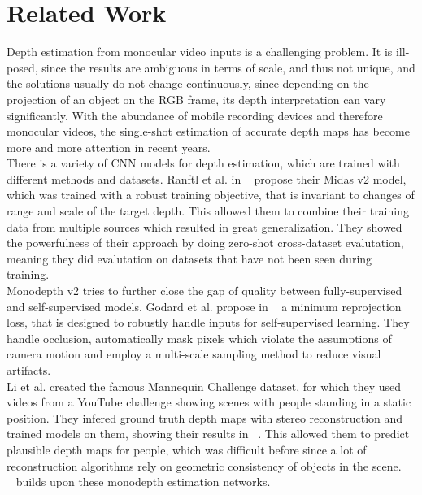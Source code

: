 \chapter{Related Work}
    Depth estimation from monocular video inputs is a challenging problem.
    It is ill-posed, since the results are ambiguous in terms of scale, and thus not unique, and the solutions usually do not change continuously, since depending on the projection of an object on the RGB frame, its depth interpretation can vary significantly.
    With the abundance of mobile recording devices and therefore monocular videos, the single-shot estimation of accurate depth maps has become more and more attention in recent years.\\
    There is a variety of CNN models for depth estimation, which are trained with different methods and datasets.
    Ranftl et al. in ~\cite{ranftl2020robust} propose their Midas v2 model, which was trained with a robust training objective, that is invariant to changes of range and scale of the target depth.
    This allowed them to combine their training data from multiple sources which resulted in great generalization.
    They showed the powerfulness of their approach by doing zero-shot cross-dataset evalutation, meaning they did evalutation on datasets that have not been seen during training.\\
    Monodepth v2 tries to further close the gap of quality between fully-supervised and self-supervised models.
    Godard et al. propose in ~\cite{godard2019digging} a minimum reprojection loss, that is designed to robustly handle inputs for self-supervised learning.
    They handle occlusion, automatically mask pixels which violate the assumptions of camera motion and employ a multi-scale sampling method to reduce visual artifacts.\\
    Li et al. created the famous Mannequin Challenge dataset, for which they used videos from a YouTube challenge showing scenes with people standing in a static position.
    They infered ground truth depth maps with stereo reconstruction and trained models on them, showing their results in ~\cite{mannequin}.
    This allowed them to predict plausible depth maps for people, which was difficult before since a lot of reconstruction algorithms rely on geometric consistency of objects in the scene.\\
    ~\cite{luo2020consistent} builds upon these monodepth estimation networks.
